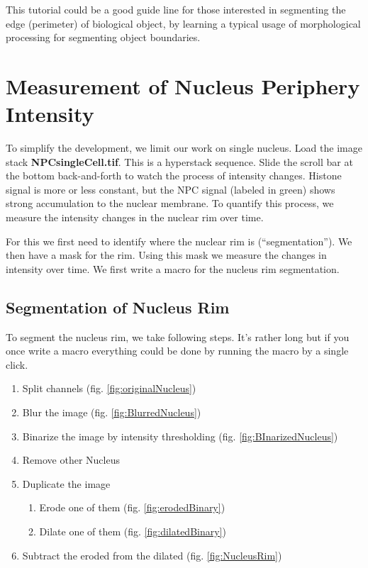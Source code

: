 This tutorial could be a good guide line for those interested in segmenting the edge (perimeter) of biological object, by learning a typical usage of morphological processing for segmenting object boundaries. 

\section{Measurement of Nucleus Periphery Intensity}

To simplify the development, we limit our work on single nucleus. Load the image stack \textbf{NPCsingleCell.tif}. This is a hyperstack sequence. Slide the scroll bar at the bottom back-and-forth to watch the process of intensity changes. Histone signal is more or less constant, but the NPC signal (labeled in green) shows strong accumulation to the nuclear membrane. To quantify this process, we measure the intensity changes in the nuclear rim over time.

For this we first need to identify where the nuclear rim is (``segmentation''). We then have a mask for the rim. Using this mask we measure the changes in intensity over time. We first write a macro for the nucleus rim segmentation. 

\subsection{Segmentation of Nucleus Rim}

To segment the nucleus rim, we take following steps. It's rather long but if you once write a macro everything could be done by running the macro by a single click. 

\begin{enumerate}
  \item Split channels (fig. \ref{fig:originalNucleus})
    \item Blur the image (fig. \ref{fig:BlurredNucleus})
    \item Binarize the image by intensity thresholding (fig. \ref{fig:BInarizedNucleus})
    \item Remove other Nucleus
    \item Duplicate the image
    \begin{enumerate}
        \item Erode one of them (fig. \ref{fig:erodedBinary})

        \item Dilate one of them (fig. \ref{fig:dilatedBinary})

    \end{enumerate}
    \item Subtract the eroded from the dilated (fig. \ref{fig:NucleusRim})

\end{enumerate}

